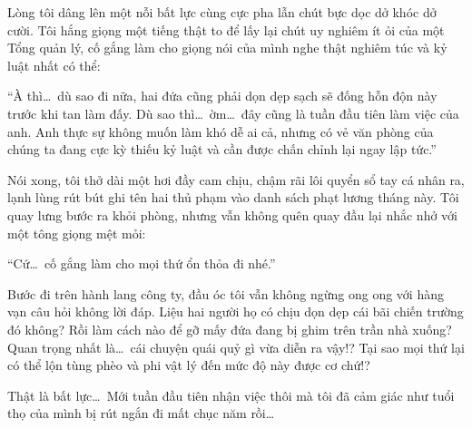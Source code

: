 \documentclass[../main.tex]{subfiles}
\begin{document}
Lòng tôi dâng lên một nỗi bất lực cùng cực pha lẫn chút bực dọc dở khóc dở cười. Tôi hắng giọng một tiếng thật to để lấy lại chút uy nghiêm ít ỏi của một Tổng quản lý, cố gắng làm cho giọng nói của mình nghe thật nghiêm túc và kỷ luật nhất có thể:

``À thì\dots\ dù sao đi nữa, hai đứa cũng phải dọn dẹp sạch sẽ đống hỗn độn này trước khi tan làm đấy. Dù sao thì\dots\ ờm\dots\ đây cũng là tuần đầu tiên làm việc của anh. Anh thực sự không muốn làm khó dễ ai cả, nhưng có vẻ văn phòng của chúng ta đang cực kỳ thiếu kỷ luật và cần được chấn chỉnh lại ngay lập tức.''

Nói xong, tôi thở dài một hơi đầy cam chịu, chậm rãi lôi quyển sổ tay cá nhân ra, lạnh lùng rút bút ghi tên hai thủ phạm vào danh sách phạt lương tháng này. Tôi quay lưng bước ra khỏi phòng, nhưng vẫn không quên quay đầu lại nhắc nhở với một tông giọng mệt mỏi:

``Cứ\dots\ cố gắng làm cho mọi thứ ổn thỏa đi nhé.''

Bước đi trên hành lang công ty, đầu óc tôi vẫn không ngừng ong ong với hàng vạn câu hỏi không lời đáp. Liệu hai người họ có chịu dọn dẹp cái bãi chiến trường đó không? Rồi làm cách nào để gỡ mấy đứa đang bị ghim trên trần nhà xuống? Quan trọng nhất là\dots\ cái chuyện quái quỷ gì vừa diễn ra vậy!? Tại sao mọi thứ lại có thể lộn tùng phèo và phi vật lý đến mức độ này được cơ chứ!?

Thật là bất lực\dots\ Mới tuần đầu tiên nhận việc thôi mà tôi đã cảm giác như tuổi thọ của mình bị rút ngắn đi mất chục năm rồi\dots
\end{document}
